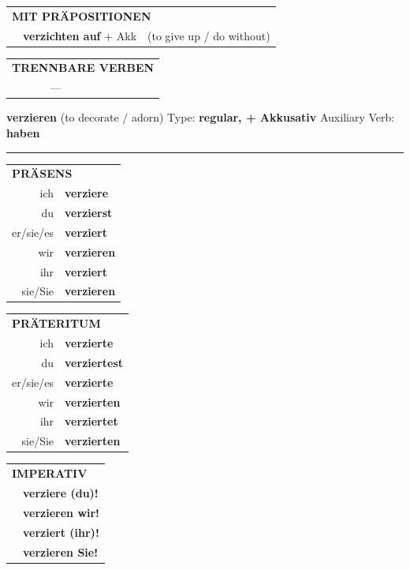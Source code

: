 \documentclass[10pt,a4paper]{revtex4-2}
\begin{document}
\begin{verbbox}
\vspace{10pt}

\begin{tabular}{lll}
\multicolumn{3}{l}{\textbf{MIT PRÄPOSITIONEN}}\\
& \textbf{verzichten auf} + Akk & (to give up / do without)\\
\end{tabular}
\hfill
\begin{tabular}{lll}
\multicolumn{3}{l}{\textbf{TRENNBARE VERBEN}}\\
& --- & \\
\end{tabular}
\vspace{-5pt}
\end{verbbox}

\begin{verbbox-acc}
{\Large \bf verzieren} (to decorate / adorn) \hfill Type: \textbf{regular, + Akkusativ} \hfill Auxiliary Verb: \textbf{haben}

\vspace{5pt}
\hrule
\vspace{5pt}

\begin{tabular}{rl}
\multicolumn{2}{l}{\textbf{PRÄSENS}}\\
ich & \textbf{verziere}\\
du & \textbf{verzierst}\\
er/sie/es & \textbf{verziert}\\
wir & \textbf{verzieren}\\
ihr & \textbf{verziert}\\
sie/Sie & \textbf{verzieren}\\
\end{tabular}
\hfill
\begin{tabular}{rl}
\multicolumn{2}{l}{\textbf{PRÄTERITUM}}\\
ich & \textbf{verzierte}\\
du & \textbf{verziertest}\\
er/sie/es & \textbf{verzierte}\\
wir & \textbf{verzierten}\\
ihr & \textbf{verziertet}\\
sie/Sie & \textbf{verzierten}\\
\end{tabular}
\hfill
\begin{tabular}{rl}
\multicolumn{2}{l}{\textbf{IMPERATIV}}\\
& \textbf{verziere (du)!}\\
& \textbf{verzieren wir!}\\
& \textbf{verziert (ihr)!}\\
& \textbf{verzieren Sie!}\\
\end{tabular}


\end{verbbox-acc}
\end{document}
